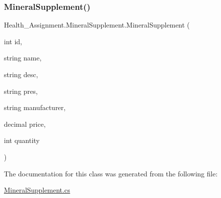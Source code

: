 \mbox{\label{class_health___assignment_1_1_mineral_supplement_a1850dd4d50b6456ffb0c298ed3d827ae}} 
\subsubsection{\texorpdfstring{Mineral\+Supplement()}{MineralSupplement()}\hspace{0.1cm}{\footnotesize\ttfamily [3/3]}}
{\footnotesize\ttfamily Health\+\_\+\+Assignment.\+Mineral\+Supplement.\+Mineral\+Supplement (\begin{DoxyParamCaption}\item[{int}]{id,  }\item[{string}]{name,  }\item[{string}]{desc,  }\item[{string}]{pres,  }\item[{string}]{manufacturer,  }\item[{decimal}]{price,  }\item[{int}]{quantity }\end{DoxyParamCaption})\hspace{0.3cm}{\ttfamily [inline]}}



The documentation for this class was generated from the following file\+:\begin{DoxyCompactItemize}
\item 
\hyperlink{_mineral_supplement_8cs}{Mineral\+Supplement.\+cs}\end{DoxyCompactItemize}

